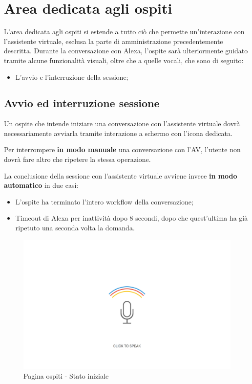 \documentclass[../ManualeUtente_v1.0.0.tex]{subfiles}
\begin{document}
	\section{Area dedicata agli ospiti}
	\label{sub:GuestArea}
	L'area dedicata agli ospiti si estende a tutto ciò che permette un'interazione con l'assistente virtuale, esclusa la parte di amministrazione precedentemente descritta.
	Durante la conversazione con Alexa, l'ospite sarà ulteriormente guidato tramite alcune funzionalità visuali, oltre che a quelle vocali, che sono di seguito:

		\begin{itemize}
			\item L'avvio e l'interruzione della sessione;
		\end{itemize}

		\subsection{Avvio ed interruzione sessione}
		\label{sub:StartStopSession}
		Un ospite che intende iniziare una conversazione con l'assistente virtuale dovrà necessariamente avviarla tramite interazione a schermo con l'icona dedicata.

		Per interrompere \textbf{in modo manuale} una conversazione con l'AV, l'utente non dovrà fare altro che ripetere la stessa operazione.

		La conclusione della sessione con l'assistente virtuale avviene invece \textbf{in modo automatico} in due casi:
		\begin{itemize}
			\item L'ospite ha terminato l'intero workflow della conversazione;
			\item Timeout di Alexa per inattività dopo 8 secondi, dopo che quest'ultima ha già ripetuto una seconda volta la domanda.
		\end{itemize}
		
		\begin{figure}[!h]
			\centering
		 	\includegraphics[width=\textwidth]{Screenshot/guest-speak.png}
			\caption{Pagina ospiti - Stato iniziale}
			\label{fig:label}
		\end{figure}
		
\end{document}

